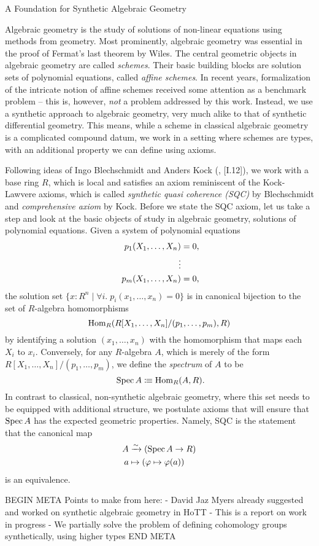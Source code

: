 \documentclass{../util/zariski}
\begin{document}
\begin{center}
  \LARGE{A Foundation for Synthetic Algebraic Geometry}
\end{center}

Algebraic geometry is the study of solutions of non-linear equations using methods from geometry.
Most prominently, algebraic geometry was essential in the proof of Fermat's last theorem by Wiles.
The central geometric objects in algebraic geometry are called \emph{schemes}.
Their basic building blocks are solution sets of polynomial equations, called \emph{affine schemes}.
In recent years,
formalization of the intricate notion of affine schemes
received some attention as a benchmark problem
-- this is, however, \emph{not} a problem addressed by this work.
Instead, we use a synthetic approach to algebraic geometry,
very much alike to that of synthetic differential geometry.
This means, while a scheme in classical algebraic geometry is a complicated compound datum,
we work in a setting where schemes are types,
with an additional property we can define using axioms.

Following ideas of Ingo Blechschmidt and Anders Kock  (\cite{ingo-thesis}, \cite{kock-sdg}[I.12]),
we work with a base ring $R$, which is local and satisfies an axiom reminiscent of the Kock-Lawvere axioms,
which is called \emph{synthetic quasi coherence (SQC)} by Blechschmidt and \emph{comprehensive axiom} by Kock.
Before we state the SQC axiom, let us take a step and look at the basic objects of study in algebraic geometry,
solutions of polynomial equations. 
Given a system of polynomial equations
\begin{align*}
  p_1(X_1, \dots, X_n) &= 0\rlap{,} \\
  \vdots  \\
  p_m(X_1, \dots, X_n) &= 0\rlap{,}
\end{align*}
the solution set
$\{ x : R^n \mid \forall i.\; p_i(x_1, \dots, x_n) = 0 \}$
is in canonical bijection to the set of $R$-algebra homomorphisms
\[ \mathrm{Hom}_R(R[X_1, \dots, X_n]/(p_1, \dots, p_m), R) \]
by identifying a solution $(x_1,\dots,x_n)$ with the homomorphism that maps each $X_i$ to $x_i$.
Conversely, for any $R$-algebra $A$, which is merely of the form $R[X_1, \dots, X_n]/(p_1, \dots, p_m)$,
we define the \emph{spectrum} of $A$ to be
\[
  \Spec A \colonequiv \Hom_R(A, R)
  \rlap{.}
\]
In contrast to classical, non-synthetic algebraic geometry,
where this set needs to be equipped with additional structure,
we postulate axioms that will ensure that $\operatorname{Spec} A$ has the expected geometric properties.
Namely, SQC is the statement that the canonical map
  \begin{align*}
    A&\xrightarrow{\sim} (\operatorname{Spec} A\to R) \\
    a&\mapsto (\varphi\mapsto \varphi(a))
  \end{align*}
is an equivalence.

BEGIN META
Points to make from here:
- David Jaz Myers already suggested and worked on synthetic algebraic geometry in HoTT
- This is a report on work in progress
- We partially solve the problem of defining cohomology groups synthetically, using higher types
END META

\printbibliography
\end{document}
